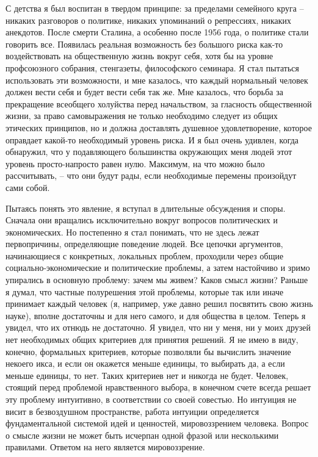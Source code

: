 \documentclass{book}
\begin{document}
{С детства я был воспитан в твердом принципе: за пределами семейного круга -- никаких разговоров о политике, никаких упоминаний о репрессиях, никаких анекдотов. После смерти Сталина, а особенно после 1956 года, о политике стали говорить все. Появилась реальная возможность без большого риска как-то воздействовать на общественную жизнь вокруг себя, хотя бы на уровне профсоюзного собрания, стенгазеты, фило­софского семинара. Я стал пытаться использовать эти возмож­ности, и мне казалось, что каждый нормальный человек должен вести себя и будет вести себя так же. Мне казалось, что борьба за прекращение всеобщего холуйства перед начальством, за гласность общественной жизни, за право самовыражения не только необходимо следует из общих этических принципов, но и должна доставлять душевное удовлетворение, которое оправдает какой-то необходимый уровень риска. И я был очень удивлен, когда обнаружил, что у подавляющего большинства окружающих меня людей этот уровень просто-напросто равен нулю. Максимум, на что можно было 
рассчитывать, -- что они будут рады, если необходимые перемены произойдут сами собой.

Пытаясь понять это явление, я вступал в длительные обсуж­дения и споры. Сначала они вращались исключительно вокруг вопросов политических и экономических. Но постепенно я стал понимать, что не здесь лежат первопричины, определяющие поведение людей. Все цепочки аргументов, начинающиеся с конкретных, локальных проблем, проходили через общие социально-экономические и политические проблемы, а затем настойчиво и зримо упирались в основную проблему: зачем мы живем? Каков смысл жизни? Раньше я думал, что частные полурешения этой проблемы, которые так или иначе принимает каждый человек (я, например, уже давно решил посвятить свою жизнь науке), вполне достаточны и для него самого, и для общества в целом. Теперь я увидел, что их отнюдь не достаточно. Я увидел, что ни у меня, ни у моих друзей нет необходимых общих критериев для принятия решений. Я не имею в виду, конечно, формальных  критериев, которые позволяли бы вычислить значение некоего икса, и если он окажется меньше единицы, то выбирать да,  а если меньше единицы,
 то нет.  Таких критериев нет и никогда не будет. Человек, стоящий перед проблемой нравственного выбора, в конечном счете всегда решает эту проблему интуитивно, в соответствии со своей совестью. Но интуиция не висит в безвоздушном пространстве, работа интуиции определяется фундаментальной системой идей и цен­ностей, мировоззрением человека. Вопрос о смысле жизни не может быть исчерпан одной фразой или несколькими правилами. Ответом на него является мировоззрение.

}
\end{document}
